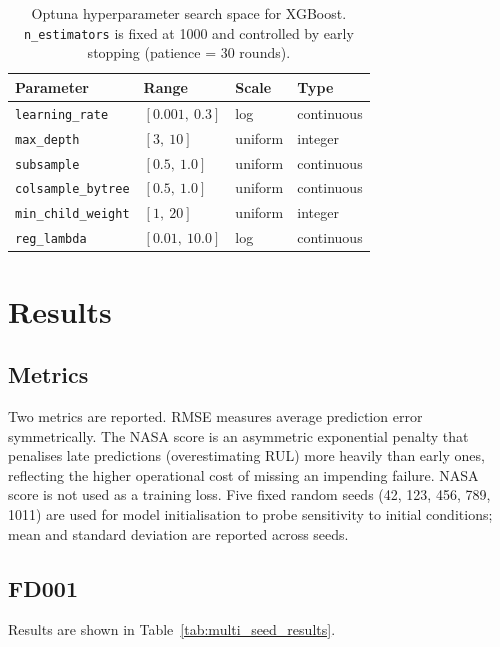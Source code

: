 \documentclass[a4paper,11pt]{article}
\begin{document}
\begin{table}[h]
    \centering
    \begin{tabular}{llll}
        \hline
        \textbf{Parameter} & \textbf{Range} & \textbf{Scale} & \textbf{Type} \\
        \hline
        \texttt{learning\_rate}     & $[0.001,\ 0.3]$  & log     & continuous \\
        \texttt{max\_depth}         & $[3,\ 10]$       & uniform & integer    \\
        \texttt{subsample}          & $[0.5,\ 1.0]$    & uniform & continuous \\
        \texttt{colsample\_bytree}  & $[0.5,\ 1.0]$    & uniform & continuous \\
        \texttt{min\_child\_weight} & $[1,\ 20]$       & uniform & integer    \\
        \texttt{reg\_lambda}        & $[0.01,\ 10.0]$  & log     & continuous \\
        \hline
    \end{tabular}
    \caption{Optuna hyperparameter search space for XGBoost. \texttt{n\_estimators} is fixed at 1000 and controlled by early stopping (patience = 30 rounds).}
    \label{tab:xgb_hparams}
\end{table}

\section{Results}

\subsection{Metrics}
Two metrics are reported. RMSE measures average prediction error symmetrically.
The NASA score is an asymmetric exponential penalty that penalises late predictions (overestimating RUL) more heavily than early ones, reflecting the higher operational cost of missing an impending failure.
NASA score is not used as a training loss.
Five fixed random seeds (42, 123, 456, 789, 1011) are used for model initialisation to probe sensitivity to initial conditions; mean and standard deviation are reported across seeds.

\subsection{FD001}

Results are shown in Table~\ref{tab:multi_seed_results}.
\end{document}
